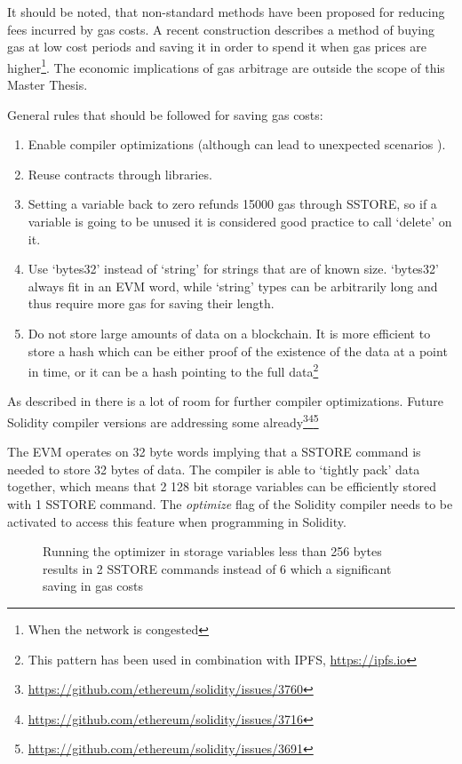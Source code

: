 It should be noted, that non-standard methods have been proposed for reducing fees incurred by gas costs. A recent construction\cite{gastoken} describes a method of buying gas at low cost periods and saving it in order to spend it when gas prices are higher\footnote{When the network is congested}. The economic implications of gas arbitrage are outside the scope of this Master Thesis. 

General rules that should be followed for saving gas costs:
\begin{enumerate}
    \item Enable compiler optimizations (although can lead to unexpected scenarios \cite{compiler}).
    \item Reuse contracts through libraries\cite{library}.
    \item Setting a variable back to zero refunds 15000 gas through SSTORE, so if a variable is going to be unused it is considered good practice to call `delete' on it. 
    \item Use `bytes32' instead of `string' for strings that are of known size. `bytes32' always fit in an EVM word, while `string' types can be arbitrarily long and thus require more gas for saving their length.
    \item Do not store large amounts of data on a blockchain. It is more efficient to store a hash which can be either proof of the existence of the data at a point in time, or it can be a hash pointing to the full data\footnote{This pattern has been used in combination with IPFS, \url{https://ipfs.io}}
\end{enumerate}

As described in \cite{DBLP:journals/corr/ChenLLZ17} there is a lot of room for further compiler optimizations. Future Solidity compiler versions are addressing some already\footnote{\url{https://github.com/ethereum/solidity/issues/3760}}\footnote{\url{https://github.com/ethereum/solidity/issues/3716}}\footnote{\url{https://github.com/ethereum/solidity/issues/3691}}

The EVM operates on 32 byte words implying that a SSTORE command is needed to store 32 bytes of data. The compiler is able to `tightly pack' data together, which means that 2 128 bit storage variables can be efficiently stored with 1 SSTORE command. The \textit{optimize} flag of the Solidity compiler needs to be activated to access this feature when programming in Solidity.

\begin{figure}[H]
  \begin{subfigure}[b]{\textwidth}
    \centering
    
  \end{subfigure}

  \begin{subfigure}[b]{\textwidth}
    \centering
    
  \end{subfigure}
  \label{fig:struct_optimization}
  \caption{Running the optimizer in storage variables less than 256 bytes results in 2 SSTORE commands instead of 6 which a significant saving in gas costs}
\end{figure}

